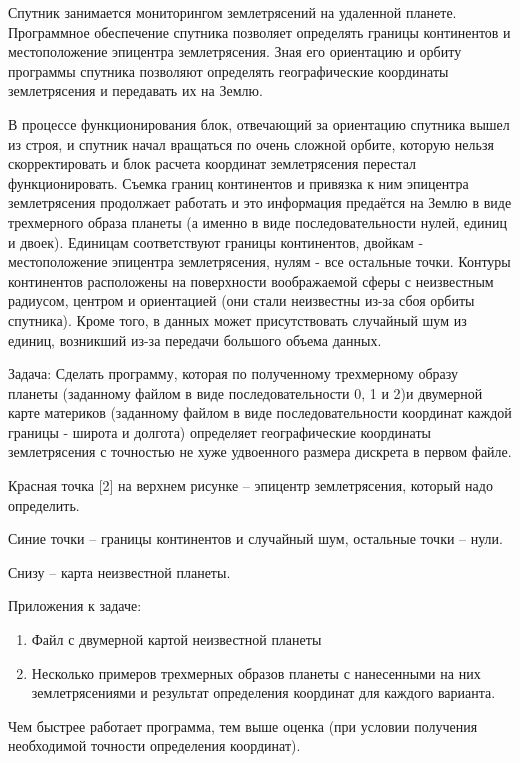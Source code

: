 
Спутник занимается мониторингом землетрясений на удаленной планете. Программное обеспечение спутника позволяет определять границы континентов и местоположение эпицентра землетрясения. Зная его ориентацию и орбиту программы спутника позволяют определять географические координаты землетрясения и передавать их на Землю.

В процессе функционирования блок, отвечающий за ориентацию спутника вышел из строя, и спутник начал вращаться по очень сложной орбите, которую нельзя скорректировать и блок расчета координат землетрясения перестал функционировать. Съемка границ континентов и привязка к ним эпицентра землетрясения продолжает работать и это информация предаётся на Землю в виде трехмерного образа планеты (а именно в виде последовательности нулей, единиц и двоек). Единицам соответствуют границы континентов, двойкам - местоположение эпицентра землетрясения, нулям - все остальные точки. Контуры континентов расположены на поверхности воображаемой сферы с неизвестным радиусом, центром и ориентацией (они стали неизвестны из-за сбоя орбиты спутника). Кроме того, в данных может присутствовать случайный шум из единиц, возникший из-за передачи большого объема данных.

Задача: Сделать программу, которая по полученному трехмерному образу планеты (заданному файлом в виде последовательности 0, 1 и 2)и двумерной карте материков (заданному файлом в виде последовательности координат каждой границы - широта и долгота) определяет географические координаты землетрясения с точностью не хуже удвоенного размера дискрета в первом файле.

\explaneSection


Красная точка [2] на верхнем рисунке -- эпицентр землетрясения, который надо определить.

Синие точки -- границы континентов и случайный шум, остальные точки -- нули.

Снизу -- карта неизвестной планеты.
 

Приложения к задаче:
\begin{enumerate}
    \item Файл с двумерной картой неизвестной планеты
    \item Несколько примеров трехмерных образов планеты с нанесенными на них землетрясениями и результат определения координат для каждого варианта.
\end{enumerate}

\markSection

Чем быстрее работает программа, тем выше оценка (при условии получения необходимой точности определения координат).

